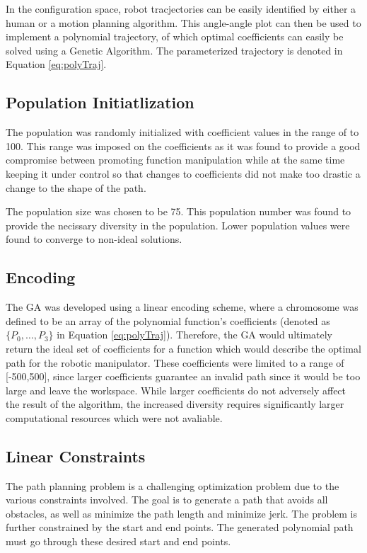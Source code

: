 In the configuration space, robot tracjectories can be easily identified by either a human or a motion planning algorithm. This angle-angle plot can then be used to implement a polynomial trajectory, of which optimal coefficients can easily be solved using a Genetic Algorithm. The parameterized trajectory is denoted in Equation \ref{eq:polyTraj}.

\subsection{Population Initiatlization}
The population was randomly initialized with coefficient values in the range of  to 100. This range was imposed on the coefficients as it was found to provide a good compromise between promoting function manipulation while at the same time keeping it under control so that changes to coefficients did not make too drastic a change to the shape of the path.

The population size was chosen to be 75. This population number was found to provide the necissary diversity in the population. Lower population values were found to converge to non-ideal solutions.

\subsection{Encoding}
The GA was developed using a linear encoding scheme, where a chromosome was defined to be an array of the polynomial function's coefficients (denoted as $\{P_0, \ldots, P_3\}$ in Equation \ref{eq:polyTraj}). Therefore, the GA would ultimately return the ideal set of coefficients for a function which would describe the optimal path for the robotic manipulator. These coefficients were limited to a range of [-500,500], since larger coefficients guarantee an invalid path since it would be too large and leave the workspace. While larger coefficients do not adversely affect the result of the algorithm, the increased diversity requires significantly larger computational resources which were not avaliable.

\subsection{Linear Constraints}
The path planning problem is a challenging optimization problem due to the various constraints
involved. The goal is to generate a path that avoids all obstacles, as well as minimize the path length and
minimize jerk. The problem is further constrained by the start and end points. The generated polynomial path must go through these desired start and end points.

